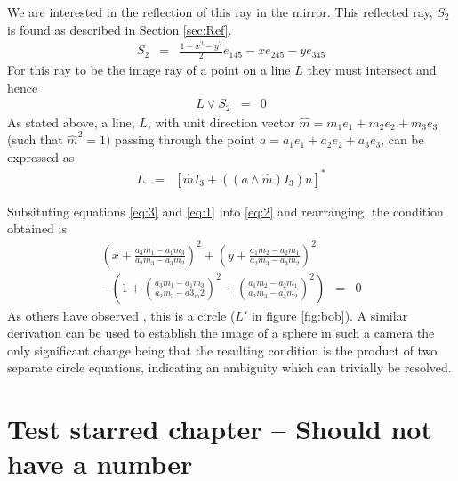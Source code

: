 We are interested in the reflection of this ray in the mirror.  This reflected ray, $S_2$ is found as
described in Section \ref{sec:Ref}.  
\begin{eqnarray} 
\label{eq:1} 
S_2 &=& \frac{1-x^2-y^2}2e_{145} -xe_{245} - y e_{345} 
\end{eqnarray}  
For this ray to be the image ray of a point on a line $L$ they must intersect and hence
\begin{eqnarray} 
\label{eq:2} L\vee S_2 &=& 0 
\end{eqnarray} 
As stated above, a line, $L$, with unit direction vector $\hat{m} = m_1e_1 + m_2e_2 + m_3e_3$ (such that $\hat{m}^2 = 1$) passing through the point $a = a_1e_1 + a_2e_2 + a_3e_3$, can be expressed as 
\begin{eqnarray} 
\label{eq:3} L &=& \left[\hat{m}I_3 + ((a\wedge \hat{m})I_3)n\right]^* 
\end{eqnarray} 

Subsituting equations \ref{eq:3} and \ref{eq:1} into \ref{eq:2} and rearranging, the condition obtained is 
\begin{eqnarray}
  \left(x + \frac{a_3m_1 - a_1m_3}{a_2m_3 -a_3m_2}\right)^2 + \left(y + \frac{a_1m_2 - a_2m_1}{a_2m_3 - a_3m_2}\right)^2 \nonumber&&\\- \left(1 + \left(\frac{a_3m_1 - a_1m_3}{a_2m_3 - a3_m2}\right)^2 + \left(\frac{a_1m_2 - a_2m_1}{a_2m_3 -a_3m_2}\right)^2\right) &=& 0
\end{eqnarray} 
As others have observed \cite{CAM:gd}, this is a circle ($L'$ in figure
		\ref{fig:bob}). A similar derivation can be used to establish
the image of a sphere in such a camera the only significant change being that
the resulting condition is the product of two separate circle equations,
    indicating an ambiguity which can trivially be resolved.  \nocite{CAM:bclf}

\chapter*{Test starred chapter -- Should not have a number}


